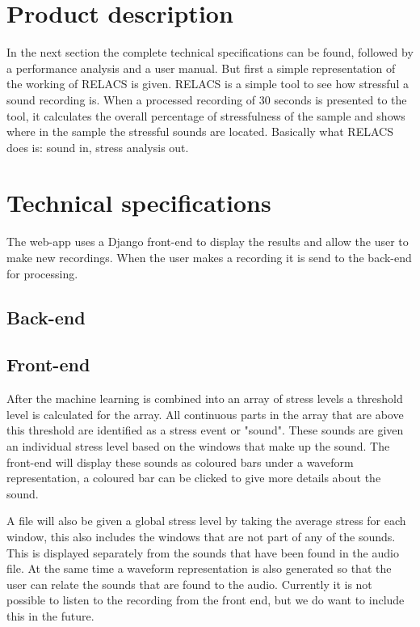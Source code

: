 \documentclass[a4paper]{article}
\begin{document}
\section{Product description}
In the next section the complete technical specifications can be found, followed by a performance analysis and a user manual. 
But first a simple representation of the working of RELACS is given. RELACS is a simple tool to see how stressful a sound recording is. 
When a processed recording of 30 seconds is presented to the tool, it calculates the overall percentage of stressfulness of the sample and shows where in the sample the stressful sounds are located. 
Basically what RELACS does is: sound in, stress analysis out.


\section{Technical specifications}

The web-app uses a Django front-end to display the results and allow the user
to make new recordings. When the user makes a recording it is send to the back-end for processing. 

\subsection{Back-end}



\subsection{Front-end}

After the machine learning is combined into an array of stress levels a threshold 
level is calculated for the array. All continuous parts in the array that are
above this threshold are identified as a stress event or "sound". These sounds
are given an individual stress level based on the windows that make up the
sound. The front-end will display these sounds as coloured bars under a waveform
representation, a coloured bar can be clicked to give more details about the
sound.

A file will also be given a global stress level by taking the average stress
for each window, this also includes the windows that are not part of any of the
sounds. This is displayed separately from the sounds that have been found in
the audio file. At the same time a waveform representation is also generated so
that the user can relate the sounds that are found to the audio. Currently it is
not possible to listen to the recording from the front end, but we do want to
include this in the future.
\end{document}
